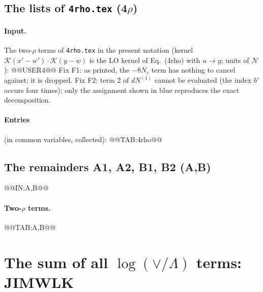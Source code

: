 \documentclass[10pt]{article}
\numberwithin{equation}{section}
\newcommand{\KK}{\mathcal K}
\newcommand{\NN}{\mathcal N}
\begin{document}
\subsection{The lists of \texttt{4rho.tex} \texorpdfstring{(4$\rho$)}{}}\label{src:4rho}
\paragraph{Input.} The two-$\rho$ terms of \texttt{4rho.tex} in the present notation (kernel $\KK(x'-w')\cdot\KK(y-w)$ is the LO kernel of Eq.~(4rho) with $u\to y$; units of $\NN$):
@@USER4@@
Fix F1: as printed, the $-8N_c$ term has nothing to cancel against; it is dropped. Fix F2: term 2 of $dN^{(1)}$ cannot be evaluated (the index $b'$ occurs four times); only the assignment shown in blue reproduces the exact decomposition.
\paragraph{Entries} (in common variables, collected):
@@TAB:4rho@@

\subsection{The remainders A1, A2, B1, B2 (A,B)}\label{src:A,B}
@@IN:A,B@@
\paragraph{Two-$\rho$ terms.}
@@TAB:A,B@@

\section{The sum of all \texorpdfstring{$\log(\vee/\Lambda)$}{log(vee/Lambda)} terms: JIMWLK}\label{sec:J}
\end{document}
